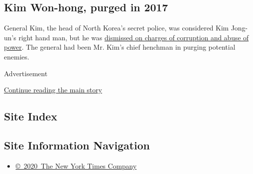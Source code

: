 \hypertarget{kim-won-hong-purged-in-2017}{%
\subsection{\texorpdfstring{\textbf{Kim Won-hong, purged in
2017}}{Kim Won-hong, purged in 2017}}\label{kim-won-hong-purged-in-2017}}

General Kim, the head of North Korea's secret police, was considered Kim
Jong-un's right hand man, but he was
\href{https://www.nytimes3xbfgragh.onion/2017/02/03/world/asia/north-korea-purge-kim-jong-un-kim-won-hong.html}{dismissed
on charges of corruption and abuse of power}. The general had been Mr.
Kim's chief henchman in purging potential enemies.

Advertisement

\protect\hyperlink{after-bottom}{Continue reading the main story}

\hypertarget{site-index}{%
\subsection{Site Index}\label{site-index}}

\hypertarget{site-information-navigation}{%
\subsection{Site Information
Navigation}\label{site-information-navigation}}

\begin{itemize}
\tightlist
\item
  \href{https://help.nytimes3xbfgragh.onion/hc/en-us/articles/115014792127-Copyright-notice}{©~2020~The
  New York Times Company}
\end{itemize}


